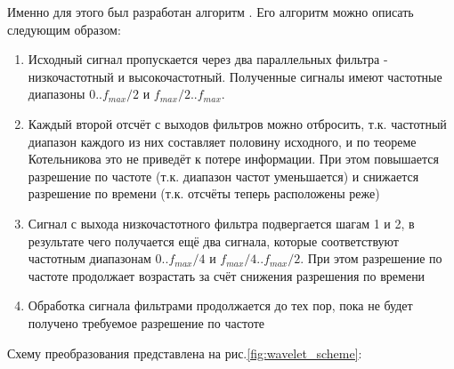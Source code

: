 Именно для этого был разработан алгоритм . Его алгоритм можно описать следующим образом:

\begin{enumerate}
\item Исходный сигнал пропускается через два параллельных фильтра - низкочастотный и высокочастотный. Полученные сигналы имеют частотные диапазоны $0..f_{max}/2$ и $f_{max}/2..f_{max}$.
\item Каждый второй отсчёт с выходов фильтров можно отбросить, т.к. частотный диапазон каждого из них составляет половину исходного, и по теореме Котельникова это не приведёт к потере информации. При этом повышается разрешение по частоте (т.к. диапазон частот уменьшается) и снижается разрешение по времени (т.к. отсчёты теперь расположены реже)

\item Сигнал с выхода низкочастотного фильтра подвергается шагам 1 и 2, в результате чего получается ещё два сигнала, которые соответствуют частотным диапазонам $0..f_{max}/4$ и $f_{max}/4..f_{max}/2$. При этом разрешение по частоте продолжает возрастать за счёт снижения разрешения по времени
\item Обработка сигнала фильтрами продолжается до тех пор, пока не будет получено требуемое разрешение по частоте
\end{enumerate}

Схему преобразования представлена на рис.\ref{fig:wavelet_scheme}\cite{wavelet_structure}:



